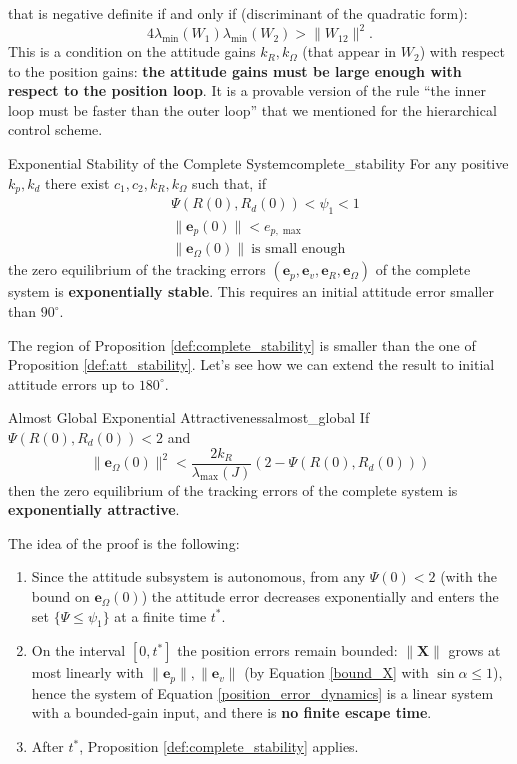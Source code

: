 \documentclass[10pt, a4paper]{report}
\begin{document}
that is negative definite if and only if (discriminant of the quadratic form):\begin{equation}
    4\lambda_{\min}(W_1)\lambda_{\min}(W_2)>\|W_{12}\|^2.
\end{equation}
This is a condition on the attitude gains $k_R,k_\Omega$ (that appear in $W_2$) with respect to the position gains: \textbf{the attitude gains must be large enough with respect to the position loop}. It is a provable version of the rule ``the inner loop must be faster than the outer loop'' that we mentioned for the hierarchical control scheme.
\begin{boxproposition}{Exponential Stability of the Complete System}{complete_stability}
For any positive $k_p,k_d$ there exist $c_1,c_2,k_R,k_\Omega$ such that, if \begin{align}
    &\Psi(R(0),R_d(0))<\psi_1<1\\
    &\|\mathbf e_p(0)\|<e_{p,\max}\\
    &\|\mathbf e_\Omega(0)\|\ \text{is small enough}
\end{align}
the zero equilibrium of the tracking errors $(\mathbf e_p,\mathbf e_v,\mathbf e_R,\mathbf e_\Omega)$ of the complete system is \textbf{exponentially stable}. This requires an initial attitude error smaller than $90^\circ$.
\end{boxproposition}
\noindent The region of Proposition \ref{def:complete_stability} is smaller than the one of Proposition \ref{def:att_stability}. Let's see how we can extend the result to initial attitude errors up to $180^\circ$.
\begin{boxproposition}{Almost Global Exponential Attractiveness}{almost_global}
If $\Psi(R(0),R_d(0))<2$ and \begin{equation}
    \|\mathbf e_\Omega(0)\|^2<\frac{2k_R}{\lambda_{\max}(J)}\left(2-\Psi(R(0),R_d(0))\right)
\end{equation}
then the zero equilibrium of the tracking errors of the complete system is \textbf{exponentially attractive}.
\end{boxproposition}
\noindent The idea of the proof is the following:\begin{enumerate}
    \item Since the attitude subsystem is autonomous, from any $\Psi(0)<2$ (with the bound on $\mathbf e_\Omega(0)$) the attitude error decreases exponentially and enters the set $\{\Psi\le\psi_1\}$ at a finite time $t^*$.
    \item On the interval $[0,t^*]$ the position errors remain bounded: $\|\mathbf X\|$ grows at most linearly with $\|\mathbf e_p\|,\|\mathbf e_v\|$ (by Equation \eqref{bound_X} with $\sin\alpha\le1$), hence the system of Equation \eqref{position_error_dynamics} is a linear system with a bounded-gain input, and there is \textbf{no finite escape time}.
    \item After $t^*$, Proposition \ref{def:complete_stability} applies.
\end{enumerate}
\end{document}
